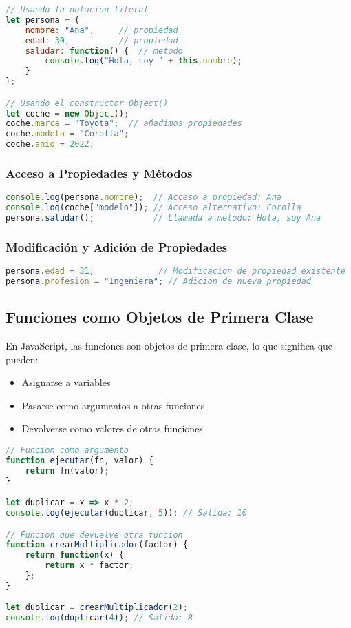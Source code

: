 \documentclass{book}
\begin{document}
\begin{lstlisting}[language=JavaScript]
// Usando la notacion literal
let persona = {
    nombre: "Ana",     // propiedad
    edad: 30,          // propiedad
    saludar: function() {  // metodo
        console.log("Hola, soy " + this.nombre);
    }
};

// Usando el constructor Object()
let coche = new Object();
coche.marca = "Toyota";  // añadimos propiedades
coche.modelo = "Corolla";
coche.anio = 2022;
\end{lstlisting}

\subsubsection{Acceso a Propiedades y Métodos}

\begin{lstlisting}[language=JavaScript]
console.log(persona.nombre);  // Acceso a propiedad: Ana
console.log(coche["modelo"]); // Acceso alternativo: Corolla
persona.saludar();            // Llamada a metodo: Hola, soy Ana
\end{lstlisting}

\subsubsection{Modificación y Adición de Propiedades}

\begin{lstlisting}[language=JavaScript]
persona.edad = 31;             // Modificacion de propiedad existente
persona.profesion = "Ingeniera"; // Adicion de nueva propiedad
\end{lstlisting}

\subsection{Funciones como Objetos de Primera Clase}

En JavaScript, las funciones son objetos de primera clase, lo que significa que pueden:

\begin{itemize}
    \item Asignarse a variables
    \item Pasarse como argumentos a otras funciones
    \item Devolverse como valores de otras funciones
\end{itemize}

\begin{lstlisting}[language=JavaScript]
// Funcion como argumento
function ejecutar(fn, valor) {
    return fn(valor);
}

let duplicar = x => x * 2;
console.log(ejecutar(duplicar, 5)); // Salida: 10

// Funcion que devuelve otra funcion
function crearMultiplicador(factor) {
    return function(x) {
        return x * factor;
    };
}

let duplicar = crearMultiplicador(2);
console.log(duplicar(4)); // Salida: 8
\end{lstlisting}
\end{document}
